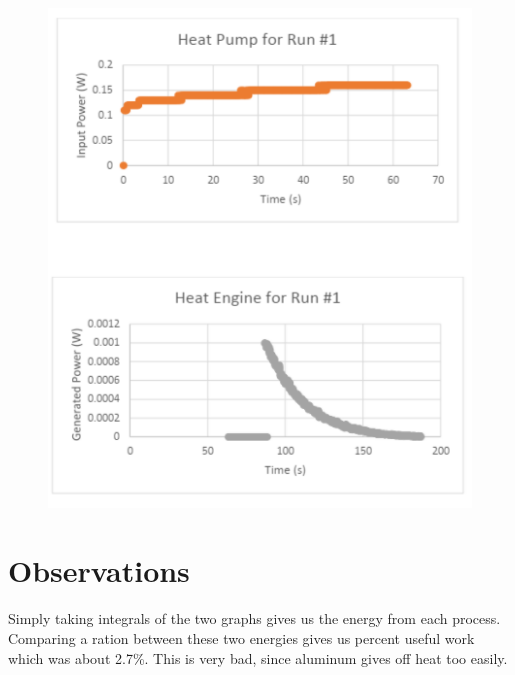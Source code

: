 \documentclass{article}
\begin{document}
\begin{figure}[h!]
\centering
\includegraphics[scale=1.2]{thermo.png}
\end{figure}

\section{Observations}

Simply taking integrals of the two graphs gives us the energy from each process. Comparing a ration between these two energies gives us percent useful work which was about 2.7\%. This is very bad, since aluminum gives off heat too easily.
\end{document}
